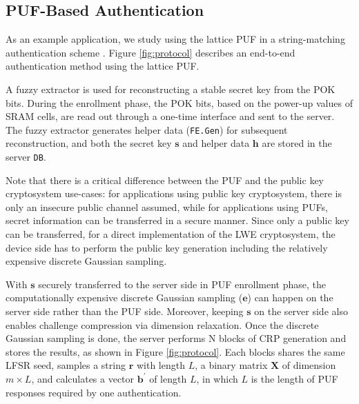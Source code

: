 \subsection{PUF-Based Authentication}
As an example application, we study using the lattice PUF in a string-matching authentication scheme \cite{suh2007physical}. 
Figure \ref{fig:protocol} describes an end-to-end authentication method using the lattice PUF. 

A fuzzy extractor \cite{bosch2008efficient} is used for reconstructing a stable secret key from the POK bits.
During the enrollment phase, the POK bits, based on the power-up values of SRAM cells, are read out through a one-time interface and sent to the server. The fuzzy extractor generates helper data (\texttt{FE.Gen})
for subsequent reconstruction, and both the secret key $\mathbf{s}$ and helper data $\mathbf{h}$ are stored in the server \texttt{DB}.

Note that there is a critical difference between the PUF and the public key cryptosystem use-cases:
for applications using public key cryptosystem, there is only an insecure public channel assumed,
while for applications using PUFs, secret information can be transferred in a secure manner.
Since only a public key can be transferred, for a direct implementation of the LWE cryptosystem, the device side has to perform the public key generation including the relatively expensive discrete Gaussian sampling. 

With $\mathbf{s}$ securely transferred to the server side in PUF enrollment phase, the computationally expensive discrete Gaussian sampling ($\mathbf{e}$) can happen on the server side rather than the PUF side.
Moreover, keeping $\mathbf{s}$ on the server side also enables challenge compression via dimension relaxation. 
Once the discrete Gaussian sampling is done, the server performs N blocks of CRP generation and stores the results, as shown in Figure \ref{fig:protocol}.
Each blocks shares the same LFSR seed, samples a string $\mathbf{r}$ with length $L$, a binary matrix $\mathbf{X}$ of dimension $m\times L$, and calculates a vector $\mathbf{b}^\prime$ of length $L$, in which $L$ is the length of PUF responses required by one authentication.  

